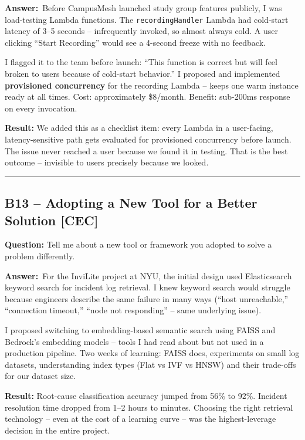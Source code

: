 \documentclass[letterpaper,10pt]{article}
\newlength{\boxwidth}
\newcommand{\bquestionbox}[1]{%
  \vspace{6pt}%
  \noindent\colorbox{bqbg}{%
    \begin{minipage}{\boxwidth}%
      \vspace{3pt}\textbf{\textcolor{orange!70!black}{Question:}} #1\vspace{3pt}%
    \end{minipage}%
  }\vspace{2pt}%
}
\newcommand{\answerlabel}{\noindent\textbf{\textcolor{answerblue}{Answer:}}~}
\begin{document}
\answerlabel Before CampusMesh launched study group features publicly, I was load-testing Lambda functions. The \texttt{recordingHandler} Lambda had cold-start latency of 3--5 seconds -- infrequently invoked, so almost always cold. A user clicking ``Start Recording'' would see a 4-second freeze with no feedback.

I flagged it to the team before launch: ``This function is correct but will feel broken to users because of cold-start behavior.'' I proposed and implemented \textbf{provisioned concurrency} for the recording Lambda -- keeps one warm instance ready at all times. Cost: approximately \$8/month. Benefit: sub-200ms response on every invocation.

\textbf{Result:} We added this as a checklist item: every Lambda in a user-facing, latency-sensitive path gets evaluated for provisioned concurrency before launch. The issue never reached a user because we found it in testing. That is the best outcome -- invisible to users precisely because we looked.

\rule{\linewidth}{0.2pt}

\subsection*{B13 -- Adopting a New Tool for a Better Solution \textmd{[CEC]}}

\bquestionbox{Tell me about a new tool or framework you adopted to solve a problem differently.}

\answerlabel For the InviLite project at NYU, the initial design used Elasticsearch keyword search for incident log retrieval. I knew keyword search would struggle because engineers describe the same failure in many ways (``host unreachable,'' ``connection timeout,'' ``node not responding'' -- same underlying issue).

I proposed switching to embedding-based semantic search using FAISS and Bedrock's embedding models -- tools I had read about but not used in a production pipeline. Two weeks of learning: FAISS docs, experiments on small log datasets, understanding index types (Flat vs IVF vs HNSW) and their trade-offs for our dataset size.

\textbf{Result:} Root-cause classification accuracy jumped from 56\% to 92\%. Incident resolution time dropped from 1--2 hours to minutes. Choosing the right retrieval technology -- even at the cost of a learning curve -- was the highest-leverage decision in the entire project.
\end{document}
